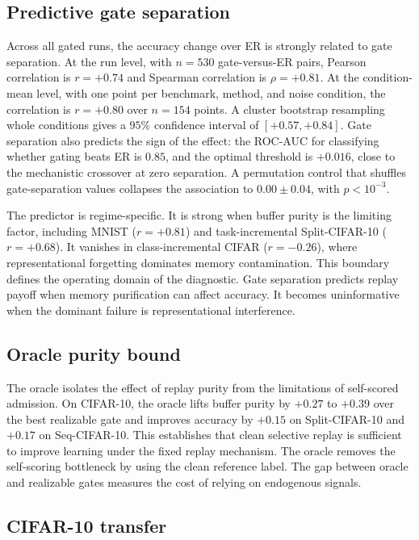 \documentclass[preprint,12pt]{elsarticle}
\begin{document}
\subsection{Predictive gate separation}

Across all gated runs, the accuracy change over ER is strongly related to gate separation. At the run level, with $n=530$ gate-versus-ER pairs, Pearson correlation is $r=+0.74$ and Spearman correlation is $\rho=+0.81$. At the condition-mean level, with one point per benchmark, method, and noise condition, the correlation is $r=+0.80$ over $n=154$ points. A cluster bootstrap resampling whole conditions gives a $95\%$ confidence interval of $[+0.57,+0.84]$. Gate separation also predicts the sign of the effect: the ROC-AUC for classifying whether gating beats ER is $0.85$, and the optimal threshold is $+0.016$, close to the mechanistic crossover at zero separation. A permutation control that shuffles gate-separation values collapses the association to $0.00\pm0.04$, with $p<10^{-3}$.

The predictor is regime-specific. It is strong when buffer purity is the limiting factor, including MNIST ($r=+0.81$) and task-incremental Split-CIFAR-10 ($r=+0.68$). It vanishes in class-incremental CIFAR ($r=-0.26$), where representational forgetting dominates memory contamination. This boundary defines the operating domain of the diagnostic. Gate separation predicts replay payoff when memory purification can affect accuracy. It becomes uninformative when the dominant failure is representational interference.

\subsection{Oracle purity bound} The oracle isolates the effect of replay purity from the limitations of self-scored admission. On CIFAR-10, the oracle lifts buffer purity by $+0.27$ to $+0.39$ over the best realizable gate and improves accuracy by $+0.15$ on Split-CIFAR-10 and $+0.17$ on Seq-CIFAR-10. This establishes that clean selective replay is sufficient to improve learning under the fixed replay mechanism. The oracle removes the self-scoring bottleneck by using the clean reference label. The gap between oracle and realizable gates measures the cost of relying on endogenous signals.

\subsection{CIFAR-10 transfer}
\end{document}
